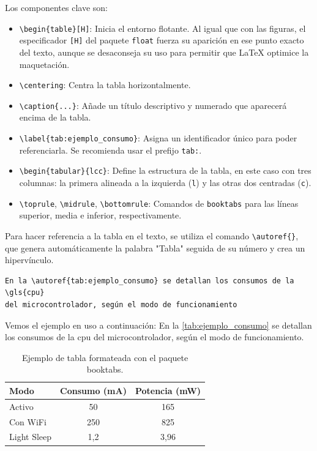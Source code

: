 \documentclass[11pt,a4paper]{book}
\begin{document}
Los componentes clave son:
\begin{itemize}
    \item \verb|\begin{table}[H]|: Inicia el entorno flotante. Al igual que con las figuras, el especificador \texttt{[H]} del paquete \texttt{float} fuerza su aparición en ese punto exacto del texto, aunque se desaconseja su uso para permitir que \LaTeX{} optimice la maquetación.
    \item \verb|\centering|: Centra la tabla horizontalmente.
    \item \verb|\caption{...}|: Añade un título descriptivo y numerado que aparecerá encima de la tabla.
    \item \verb|\label{tab:ejemplo_consumo}|: Asigna un identificador único para poder referenciarla. Se recomienda usar el prefijo \texttt{tab:}.
    \item \verb|\begin{tabular}{lcc}|: Define la estructura de la tabla, en este caso con tres columnas: la primera alineada a la izquierda (\texttt{l}) y las otras dos centradas (\texttt{c}).
    \item \verb|\toprule|, \verb|\midrule|, \verb|\bottomrule|: Comandos de \texttt{booktabs} para las líneas superior, media e inferior, respectivamente.
\end{itemize}

Para hacer referencia a la tabla en el texto, se utiliza el comando \verb|\autoref{}|, que genera automáticamente la palabra "Tabla" seguida de su número y crea un hipervínculo.

\begin{verbatim}
En la \autoref{tab:ejemplo_consumo} se detallan los consumos de la \gls{cpu} 
del microcontrolador, según el modo de funcionamiento
\end{verbatim}

Vemos el ejemplo en uso a continuación: En la \autoref{tab:ejemplo_consumo} se detallan los consumos de la \gls{cpu} del microcontrolador, según el modo de funcionamiento.

\begin{table}
    \centering
    \caption{Ejemplo de tabla formateada con el paquete booktabs.}
    \label{tab:ejemplo_consumo}
    \begin{tabular}{lcc}
        \toprule
        \textbf{Modo} & \textbf{Consumo (mA)} & \textbf{Potencia (mW)} \\
        \midrule
        Activo & 50 & 165 \\
        Con WiFi & 250 & 825 \\
        Light Sleep & 1,2 & 3,96 \\
        \bottomrule
    \end{tabular}
\end{table}
\end{document}
